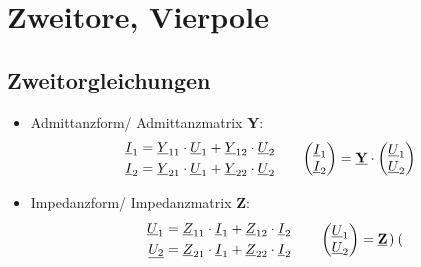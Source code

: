 \clearpage
\section{Zweitore, Vierpole}
\subsection{Zweitorgleichungen}
\renewcommand{\arraystretch}{1.2}
    \begin{itemize}[leftmargin=*]
        \item{Admittanzform/ Admittanzmatrix \textbf{Y}:}
        \begin{align*}
            \begin{split}
                \underline{I}_1 &= \underline{Y}_{11}\cdot\underline{U}_1 + \underline{Y}_{12}\cdot\underline{U}_2\\
                \underline{I}_2 &= \underline{Y}_{21}\cdot\underline{U}_1 + \underline{Y}_{22}\cdot\underline{U}_2
            \end{split} \qquad
            {\begin{pmatrix}
                \underline{I}_1 \\
                \underline{I}_2
            \end{pmatrix}} = \textbf{\underline{Y}}\cdot
            \begin{pmatrix}
                \underline{U}_1 \\
                \underline{U}_2
            \end{pmatrix}      
        \end{align*}
        \item{Impedanzform/ Impedanzmatrix \textbf{Z}:}
            \begin{align*}
                \begin{split}
                \underline{U}_1 &=\underline{Z}_{11}\cdot\underline{I}_1 + \underline{Z}_{12}\cdot\underline{I}_2 \\
                \underline{U_2} &=\underline{Z}_{21}\cdot\underline{I}_1 + \underline{Z}_{22}\cdot\underline{I}_2
                \end{split}\qquad
                \begin{pmatrix}
                    \underline{U}_1 \\
                    \underline{U}_2
                \end{pmatrix} = \textbf{\underline{Z}}\cdot
                \begin{pmatrix}

\end{pmatrix}
\end{align*}
\end{itemize}
